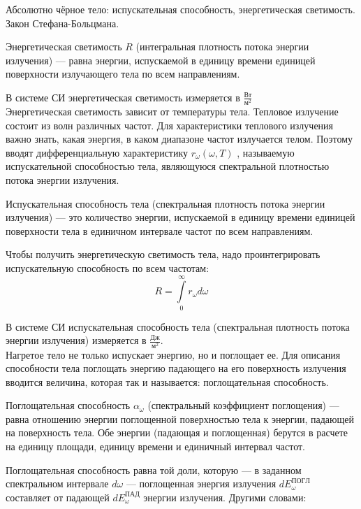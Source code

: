 \documentclass[__main__.tex]{subfiles}
\begin{document}
Абсолютно чёрное тело: испускательная способность, энергетическая светимость. Закон Стефана-Больцмана.\\ 


\begin{definition}
    Энергетическая светимость $R$ (интегральная плотность потока энергии излучения) — равна энергии, испускаемой в единицу времени единицей поверхности излучающего тела по всем направлениям.
\end{definition}


В системе СИ энергетическая светимость измеряется в $\frac{Вт}{м^2}$\\

Энергетическая светимость зависит от температуры тела. Тепловое излучение состоит из волн различных частот. Для характеристики теплового излучения важно знать, какая энергия, в каком диапазоне частот излучается телом. Поэтому вводят дифференциальную характеристику $r_ω(ω,T)$  , называемую испускательной способностью тела, являющуюся  спектральной плотностью потока энергии излучения.\\

\begin{definition}
    Испускательная способность тела (спектральная плотность потока энергии излучения) — это количество энергии, испускаемой в единицу времени единицей поверхности тела в единичном интервале частот по всем направлениям.
\end{definition}   
Чтобы получить энергетическую светимость тела, надо проинтегрировать испускательную способность по всем частотам:
$$R = \int\limits_{0}^{\infty} r_ω dω$$

В системе СИ испускательная способность тела (спектральная плотность потока энергии излучения) измеряется в $\frac{Дж}{м^2}$.\\

Нагретое тело не только испускает энергию, но и поглощает ее. Для описания способности тела поглощать энергию падающего на его поверхность излучения вводится величина, которая так и называется: поглощательная способность.\\
\begin{definition}
    Поглощательная способность $α_ω$  (спектральный коэффициент поглощения) — равна отношению энергии поглощенной поверхностью тела к энергии, падающей на поверхность тела. Обе энергии (падающая и поглощенная) берутся в расчете на единицу площади, единицу времени и единичный интервал частот.
\end{definition}
Поглощательная способность равна той доли, которую — в заданном спектральном интервале $dω$  — поглощенная энергия излучения $dE_ω^{ПОГЛ}$  составляет от падающей $dE_ω^{ПАД}$ энергии излучения. Другими словами:
\end{document}
